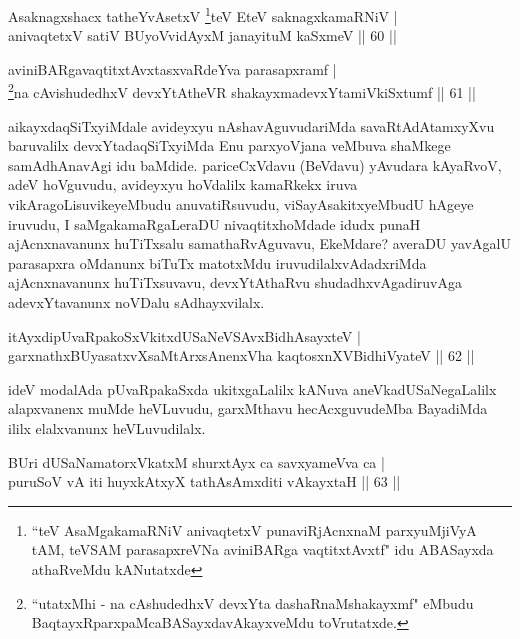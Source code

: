 \begin{shl}
Asaknagxshacx tatheYvA\s \s setxV \footnote{``teV AsaMgakamaRNiV anivaqtetxV punaviRjAcnxnaM parxyuMjiVyA tAM, teVSAM parasapxreVNa aviniBARga vaqtitxtAvxtf" idu ABASayxda athaRveMdu  kANutatxde }teV EteV saknagxkamaRNiV |\\
anivaqtetxV satiV BUyoV\s vidAyxM janayituM kaSxmeV \hfill || 60 ||
\end{shl}


\begin{shl}
aviniBARgavaqtitxtAvxtasxvaRdeYva parasapxramf |\\
\footnote{``utatxMhi - na cAshudedhxV devxYta dashaRnaMshakayxmf" eMbudu BaqtayxRparxpaMcaBASayxdavAkayxveMdu toVrutatxde.}na cAvishudedhxV devxYtAtheVR shakayxmadevxYtamiVkiSxtumf \hfill || 61 ||
\end{shl}

\begin{artha}
aikayxdaqSiTxyiMdale avideyxyu nAshavAguvudariMda savaRtAdAtamxyXvu baruvalilx devxYtadaqSiTxyiMda Enu parxyoVjana veMbuva shaMkege samAdhAnavAgi idu baMdide. \mdash  pariceCxVdavu (BeVdavu) yAvudara kAyaRvoV, adeV hoVguvudu, avideyxyu hoVdalilx kamaRkekx iruva vikAragoLisuvikeyeMbudu anuvatiRsuvudu, viSayAsakitxyeMbudU hAgeye iruvudu, I saMgakamaRgaLeraDU nivaqtitxhoMdade idudx punaH ajAcnxnavanunx huTiTxsalu samathaRvAguvavu, EkeMdare? averaDU yavAgalU parasapxra oMdanunx biTuTx matotxMdu iruvudilalxvAdadxriMda ajAcnxnavanunx huTiTxsuvavu, devxYtAthaRvu shudadhxvAgadiruvAga adevxYtavanunx noVDalu sAdhayxvilalx.
\end{artha}

\begin{shl}
itAyxdipUvaRpakoSxVkitxdUSaNeVSAvxBidhAsayxteV |\\
garxnathxBUyasatxvXsaMtArxsAnenxVha kaqtosxnXV\s BidhiVyateV \hfill || 62 ||
\end{shl}

\begin{artha}
ideV modalAda pUvaRpakaSxda ukitxgaLalilx kANuva aneVkadUSaNegaLalilx alapxvanenx muMde heVLuvudu, garxMthavu hecAcxguvudeMba BayadiMda ililx elalxvanunx heVLuvudilalx.
\end{artha}


\begin{shl}
BUri dUSaNamatorxVkatxM shurxtAyx ca savxyameVva ca |\\
puruSoV vA iti huyxkAtxyX tathA\s sAmxditi vAkayxtaH \hfill || 63 ||
\end{shl}

